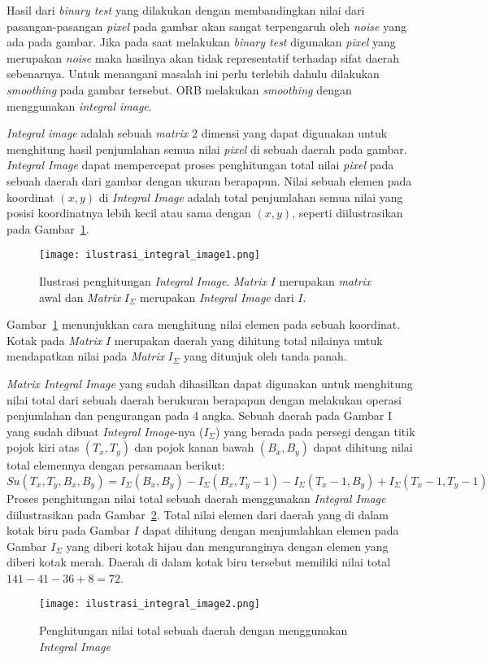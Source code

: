Hasil dari \textit{binary test} yang dilakukan dengan membandingkan nilai dari pasangan-pasangan \textit{pixel} pada gambar akan sangat terpengaruh oleh \textit{noise} yang ada pada gambar. Jika pada saat melakukan \textit{binary test} digunakan \textit{pixel} yang merupakan \textit{noise} maka hasilnya akan tidak representatif terhadap sifat daerah sebenarnya. Untuk menangani masalah ini perlu terlebih dahulu dilakukan \textit{smoothing} pada gambar tersebut. ORB melakukan \textit{smoothing} dengan menggunakan \textit{integral image}. 

\textit{Integral image} adalah sebuah \textit{matrix} 2 dimensi yang dapat digunakan untuk menghitung hasil penjumlahan semua nilai \textit{pixel} di sebuah daerah pada gambar. \textit{Integral Image} dapat mempercepat proses penghitungan total nilai \textit{pixel} pada sebuah daerah dari gambar dengan ukuran berapapun. Nilai sebuah elemen pada koordinat $(x,y)$ di \textit{Integral Image} adalah total penjumlahan semua nilai yang posisi koordinatnya lebih kecil atau sama dengan $(x,y)$, seperti diilustrasikan pada Gambar~\ref{fig:integral_image1}.
\begin{figure}[H]
	\centering
	\texttt{[image: ilustrasi\_integral\_image1.png]}
	\caption{Ilustrasi penghitungan \textit{Integral Image}. \textit{Matrix} $I$ merupakan \textit{matrix} awal dan \textit{Matrix} $I_\Sigma$ merupakan \textit{Integral Image} dari $I$.}
	\label{fig:integral_image1}
\end{figure}

Gambar~\ref{fig:integral_image1} menunjukkan cara menghitung nilai elemen pada sebuah koordinat. Kotak pada \textit{Matrix} $I$ merupakan daerah yang dihitung total nilainya untuk mendapatkan nilai pada \textit{Matrix} $I_\Sigma$ yang ditunjuk oleh tanda panah. 

\textit{Matrix Integral Image} yang sudah dihasilkan dapat digunakan untuk menghitung nilai total dari sebuah daerah berukuran berapapun dengan melakukan operasi penjumlahan dan pengurangan pada 4 angka. Sebuah daerah pada Gambar I yang sudah dibuat \textit{Integral Image}-nya ($I_\Sigma$) yang berada pada persegi dengan titik pojok kiri atas $(T_x, T_y)$ dan pojok kanan bawah $(B_x, B_y)$ dapat dihitung nilai total elemennya dengan persamaan berikut:
\begin{equation}
	Su(T_x, T_y, B_x, B_y) = I_\Sigma(B_x, B_y) - I_\Sigma(B_x, T_y-1) - I_\Sigma(T_x-1, B_y) + I_\Sigma(T_x-1,T_y-1)
\end{equation}
Proses penghitungan nilai total sebuah daerah menggunakan \textit{Integral Image} diilustrasikan pada Gambar~\ref{fig:integral_image2}. Total nilai elemen dari daerah yang di dalam kotak biru pada Gambar $I$ dapat dihitung dengan menjumlahkan elemen pada Gambar $I_\Sigma$ yang diberi kotak hijau dan menguranginya dengan elemen yang diberi kotak merah. Daerah di dalam kotak biru tersebut memiliki nilai total $141-41-36+8=72$.
\begin{figure}[H]
	\centering
	\texttt{[image: ilustrasi\_integral\_image2.png]}
	\caption{Penghitungan nilai total sebuah daerah dengan menggunakan \textit{Integral Image}}
	\label{fig:integral_image2}
\end{figure}

